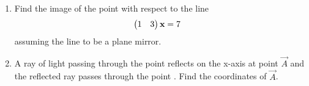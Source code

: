 \documentclass[journal,12pt,twocolumn]{IEEEtran}
\renewcommand\thesection{\arabic{section}}
\begin{document}
\begin{enumerate}[label=\thesection.\arabic*.,ref=\thesection.\theenumi]
\item Find the image of the point  with respect to the line 
%
\begin{align}
\begin{pmatrix}1 & 3\end{pmatrix}\mathbf{x} &= 7
\end{align}
%
assuming the line to be a plane mirror.
%
\\
\solution
%
\item A ray of light passing through the point  reflects on the x-axis at point $\vec{A}$ and the reflected ray passes through the point .  Find the coordinates of $\vec{A}$.
\\
\solution
%
\end{enumerate}
\end{document}
